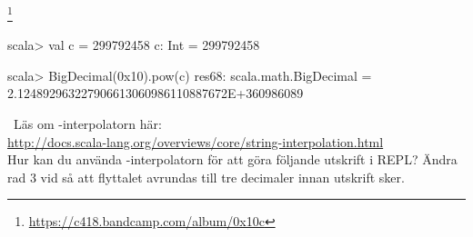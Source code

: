 \SubtaskSolved \footnote{\url{https://c418.bandcamp.com/album/0x10c}}
\begin{REPL}
scala> val c = 299792458
c: Int = 299792458

scala> BigDecimal(0x10).pow(c)
res68: scala.math.BigDecimal = 2.124892963227906613060986110887672E+360986089
\end{REPL}


\QUESTEND










\QUESTBEGIN

\Task\Uberkurs \what~Läs om -interpolatorn här:\\
\url{http://docs.scala-lang.org/overviews/core/string-interpolation.html} \\
Hur kan du använda -interpolatorn för att göra följande utskrift i REPL? Ändra rad 3 vid  så att flyttalet  avrundas till tre decimaler innan utskrift sker.

\SOLUTION

\TaskSolved \what

